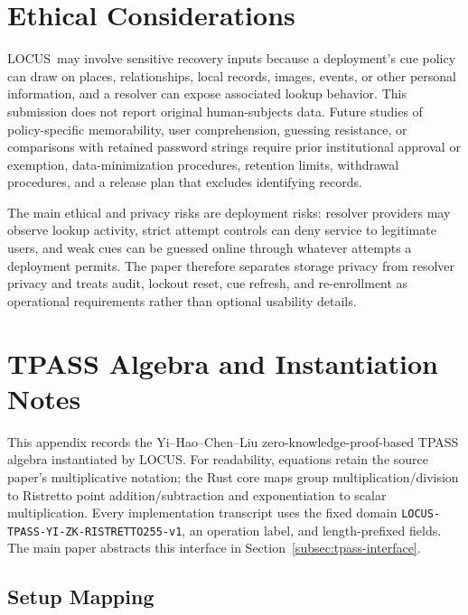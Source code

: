 \documentclass[sigconf,anonymous]{acmart}
\newcommand{\LOCUS}{\textsf{LOCUS}}
\begin{document}
\section{Ethical Considerations}
\label{sec:ethics}

\LOCUS\ may involve sensitive recovery inputs because a deployment's cue policy can draw on places, relationships, local records, images, events, or other personal information, and a resolver can expose associated lookup behavior. This submission does not report original human-subjects data. Future studies of policy-specific memorability, user comprehension, guessing resistance, or comparisons with retained password strings require prior institutional approval or exemption, data-minimization procedures, retention limits, withdrawal procedures, and a release plan that excludes identifying records.

The main ethical and privacy risks are deployment risks: resolver providers may observe lookup activity, strict attempt controls can deny service to legitimate users, and weak cues can be guessed online through whatever attempts a deployment permits. The paper therefore separates storage privacy from resolver privacy and treats audit, lockout reset, cue refresh, and re-enrollment as operational requirements rather than optional usability details.

\section{TPASS Algebra and Instantiation Notes}
\label{app:tpass}

This appendix records the Yi--Hao--Chen--Liu zero-knowledge-proof-based TPASS algebra instantiated by \LOCUS. For readability, equations retain the source paper's multiplicative notation; the Rust core maps group multiplication/division to Ristretto point addition/subtraction and exponentiation to scalar multiplication. Every implementation transcript uses the fixed domain \texttt{LOCUS-TPASS-YI-ZK-RISTRETTO255-v1}, an operation label, and length-prefixed fields. The main paper abstracts this interface in Section~\ref{subsec:tpass-interface}.

\subsection{Setup Mapping}
\end{document}
